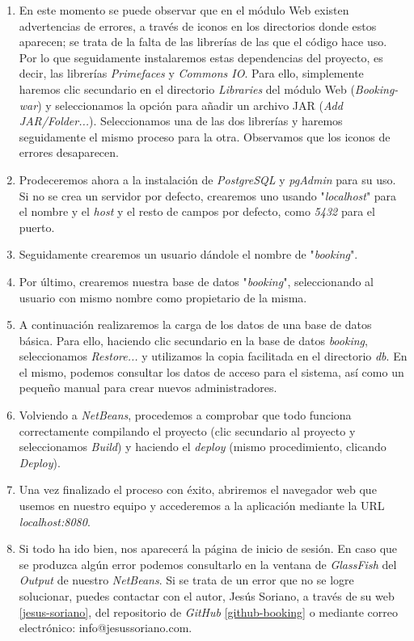 \begin{enumerate}
\item En este momento se puede observar que en el módulo Web existen advertencias de errores, a través de iconos en los directorios donde estos aparecen; se trata de la falta de las librerías de las que el código hace uso. Por lo que seguidamente instalaremos estas dependencias del proyecto, es decir, las librerías \textit{Primefaces} y \textit{Commons IO}. Para ello, simplemente haremos clic secundario en el directorio \textit{Libraries} del módulo Web (\textit{Booking-war}) y seleccionamos la opción para añadir un archivo JAR (\textit{Add JAR/Folder...}). Seleccionamos una de las dos librerías y haremos seguidamente el mismo proceso para la otra. Observamos que los iconos de errores desaparecen. 
\item Prodeceremos ahora a la instalación de \textit{PostgreSQL} y \textit{pgAdmin} para su uso. Si no se crea un servidor por defecto, crearemos uno usando "\textit{localhost}" para el nombre y el \textit{host} y el resto de campos por defecto, como \textit{5432} para el puerto. 
\item Seguidamente crearemos un usuario dándole el nombre de "\textit{booking}".
\item Por último, crearemos nuestra base de datos "\textit{booking}", seleccionando al usuario con mismo nombre como propietario de la misma. 
\item A continuación realizaremos la carga de los datos de una base de datos básica. Para ello, haciendo clic secundario en la base de datos \textit{booking}, seleccionamos \textit{Restore...} y utilizamos la copia facilitada en el directorio \textit{db}. En el mismo, podemos consultar los datos de acceso para el sistema, así como un pequeño manual para crear nuevos administradores.
\item Volviendo a \textit{NetBeans}, procedemos a comprobar que todo funciona correctamente compilando el proyecto (clic secundario al proyecto y seleccionamos \textit{Build}) y haciendo el \textit{deploy} (mismo procedimiento, clicando \textit{Deploy}). 
\item Una vez finalizado el proceso con éxito, abriremos el navegador web que usemos en nuestro equipo y accederemos a la aplicación mediante la URL \textit{localhost:8080}. 
\item Si todo ha ido bien, nos aparecerá la página de inicio de sesión. En caso que se produzca algún error podemos consultarlo en la ventana de \textit{GlassFish} del \textit{Output} de nuestro \textit{NetBeans}. Si se trata de un error que no se logre solucionar, puedes contactar con el autor, Jesús Soriano, a través de su web \ref{jesus-soriano}, del repositorio de \textit{GitHub} \ref{github-booking} o mediante correo electrónico: info@jesussoriano.com.
\end{enumerate}


